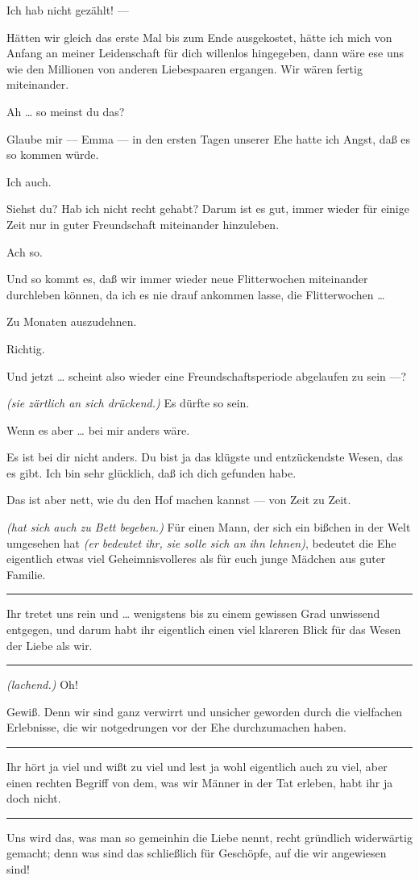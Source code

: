 \documentclass[
	final,
	a4paper,
	ngerman,
	mpinclude = true, %
	twoside = true,
	open = right,
	cleardoublepage = plain,
	DIV = 13,
	BCOR = 1cm,
	titlepage = firstiscover,
	]{scrbook}
\newcommand{\direction}[1]{\textit{(#1)}}
\newenvironment{deletion}{%
		\vspace{0.25\baselineskip}
		\hrule
		\vspace{0.25\baselineskip}
		\color{darkgray}
	}{
		\color{black}
		\vspace{0.25\baselineskip}
		\hrule 
		\vspace{0.25\baselineskip}
	}
\newcommand{\thecharacter}[1]{\textup{\textsc{#1}}\xspace}
\newcommand{\thefrau}{\thecharacter{Emma}}
\newcommand{\thegatte}{\thecharacter{Christian}}
\newcommand{\character}[1]{\item[#1:]}
\newcommand{\frau}{\character{\thefrau}}
\newcommand{\gatte}{\character{\thegatte}}
\begin{document}
\begin{play}
	\frau
	Ich hab nicht gezählt! ---

	\gatte
	Hätten wir gleich das erste Mal bis zum Ende ausgekostet, hätte ich mich von Anfang an meiner Leidenschaft für dich willenlos hingegeben, dann wäre ese uns wie den Millionen von anderen Liebespaaren ergangen. Wir wären fertig miteinander.

	\frau
	Ah \ldots{} so meinst du das?

	\gatte
	Glaube mir --- Emma --- in den ersten Tagen unserer Ehe hatte ich Angst, daß es so kommen würde.

	\frau
	Ich auch.

	\gatte
	Siehst du? Hab ich nicht recht gehabt? Darum ist es gut, immer wieder für einige Zeit nur in guter Freundschaft miteinander hinzuleben.

	\frau
	Ach so.

	\gatte
	Und so kommt es, daß wir immer wieder neue Flitterwochen miteinander durchleben können, da ich es nie drauf ankommen lasse, die Flitterwochen \ldots{}

	\frau
	Zu Monaten auszudehnen.

	\gatte
	Richtig.

	\frau
	Und jetzt \ldots{} scheint also wieder eine Freundschaftsperiode abgelaufen zu sein ---?

	\gatte
	\direction{sie zärtlich an sich drückend.} Es dürfte so sein.

	\frau
	Wenn es aber \ldots{} bei mir anders wäre.

	\gatte
	Es ist bei dir nicht anders. Du bist ja das klügste und entzückendste Wesen, das es gibt. Ich bin sehr glücklich, daß ich dich gefunden habe.

	\frau
	Das ist aber nett, wie du den Hof machen kannst --- von Zeit zu Zeit.

	\gatte
	\direction{hat sich auch zu Bett begeben.} Für einen Mann, der sich ein bißchen in der Welt umgesehen hat \direction{er bedeutet ihr, sie solle sich an ihn lehnen}, bedeutet die Ehe eigentlich etwas viel Geheimnisvolleres als für euch junge Mädchen aus guter Familie.
	\begin{deletion}
		Ihr tretet uns rein und \ldots{} wenigstens bis zu einem gewissen Grad unwissend entgegen, und darum habt ihr eigentlich einen viel klareren Blick für das Wesen der Liebe als wir.
	\end{deletion}

	\frau
	\direction{lachend.} Oh!

	\gatte
	Gewiß. Denn wir sind ganz verwirrt und unsicher geworden durch die vielfachen Erlebnisse, die wir notgedrungen vor der Ehe durchzumachen haben.
	\begin{deletion}
		Ihr hört ja viel und wißt zu viel und lest ja wohl eigentlich auch zu viel, aber einen rechten Begriff von dem, was wir Männer in der Tat erleben, habt ihr ja doch nicht.
	\end{deletion}
	Uns wird das, was man so gemeinhin die Liebe nennt, recht gründlich widerwärtig gemacht; denn was sind das schließlich für Geschöpfe, auf die wir angewiesen sind!


\end{play}
\end{document}
